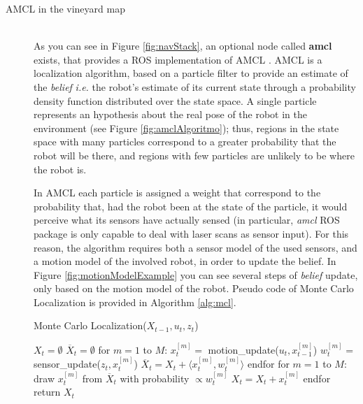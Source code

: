 \begin{description}
\item[AMCL in the vineyard map] \hfill \\
As you can see in Figure \ref{fig:navStack}, an optional node called \textbf{amcl} exists, that provides a \ac{ROS} implementation of \ac{AMCL} \parencite{amcl}. \ac{AMCL} is a localization algorithm, based on a particle filter to provide an estimate of the \textit{belief} \textit{i.e.} the robot's estimate of its current state through a probability density function distributed over the state space. A single particle represents an hypothesis about the real pose of the robot in the environment (see Figure \ref{fig:amclAlgoritmo}); thus, regions in the state space with many particles correspond to a greater probability that the robot will be there, and regions with few particles are unlikely to be where the robot is.

\par In \ac{AMCL} each particle is assigned a weight that correspond to the probability that, had the robot been at the state of the particle, it would perceive what its sensors have actually sensed (in particular, \textit{amcl} \ac{ROS} package is only capable to deal with laser scans as sensor input). For this reason, the algorithm requires both a sensor model of the used sensors, and a motion model of the involved robot, in order to update the belief. In Figure \ref{fig:motionModelExample} you can see several steps of \textit{belief} update, only based on the motion model of the robot. Pseudo code of Monte Carlo Localization is provided in Algorithm \ref{alg:mcl}.

\begin{algorithm}
\caption{Monte Carlo Localization($X_{t-1},u_t,z_t$)}\label{alg:mcl}
\begin{algorithmic}[1]
\State $X_t=\emptyset$ 				
\State $\overline{X}_t=\emptyset$
\State for $m=1$ to $M$: 
\Indent
	\State $x^{[m]}_t=$ motion\_update($u_t,x^{[m]}_{t-1}$)	 
	\State $w^{[m]}_t=$ sensor\_update($z_t,x^{[m]}_{t}$)	
	\State $\overline{X}_t = {X}_t + \big \langle x^{[m]}_t, w^{[m]}_t \big \rangle$
\EndIndent
\State endfor
\State for $m=1$ to $M$: 				
\Indent
	\State draw $x^{[m]}_t$ from $\overline{X}_t$ with probability $\propto w^{[m]}_t$
	\State $X_t=X_t+x^{[m]}_t$
\EndIndent
\State endfor
\State return $X_t$
\end{algorithmic}
\end{algorithm}


\end{description}
